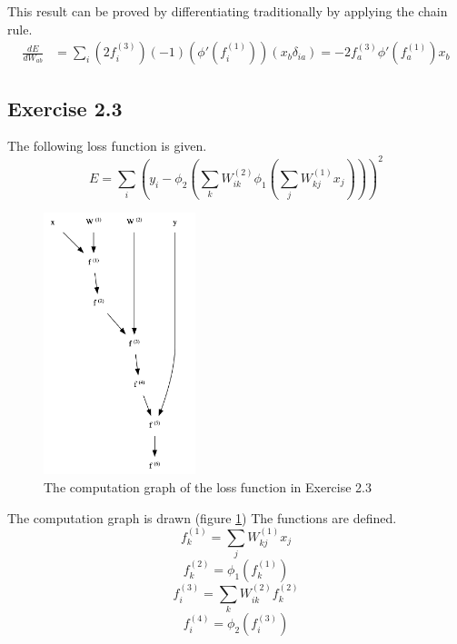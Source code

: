 \documentclass[fleqn]{report}
\begin{document}
This result can be proved by differentiating traditionally by applying the chain rule.
\begin{equation}
    \begin{split}
        \frac{d E}{d W_{ab}} & = \sum_i \left ( 2 f^{(3)}_i \right ) \left ( -1 \right ) \left ( \phi'\left(f^{(1)}_i \right) \right ) \left ( x_b \delta_{ia}\right ) =
        -2 f^{(3)}_a \phi'\left(f^{(1)}_a\right) x_b
    \end{split}
\end{equation}

\subsection*{Exercise 2.3}
The following loss function is given.
\begin{equation}
    E=\sum_i \left ( y_i - \phi_2 \left ( \sum_k W^{(2)}_{ik} \phi_1 \left ( \sum_j W^{(1)}_{kj} x_j \right ) \right ) \right )^2
\end{equation}
\begin{figure}
    \centering
    \includegraphics[height=3in]{cg23.png}
    \caption{The computation graph of the loss function in Exercise 2.3}
    \label{fig:cg23}
\end{figure}
The computation graph is drawn (figure \ref{fig:cg23}) The functions are defined.
\begin{equation}
    f^{(1)}_k = \sum_j W^{(1)}_{kj} x_j
\end{equation}
\begin{equation}
    f^{(2)}_k = \phi_1 (f^{(1)}_k)
\end{equation}
\begin{equation}
    f^{(3)}_i = \sum_k W^{(2)}_{ik} f^{(2)}_k
\end{equation}
\begin{equation}
    f^{(4)}_i = \phi_2 (f^{(3)}_i)
\end{equation}
\end{document}
